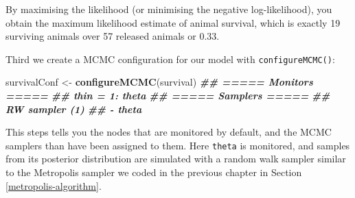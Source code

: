 \documentclass[
  12pt,
]{krantz}
\newenvironment{Shaded}{\begin{snugshade}}{\end{snugshade}}
\newcommand{\AttributeTok}[1]{\textcolor[rgb]{0.13,0.29,0.53}{#1}}
\newcommand{\CommentTok}[1]{\textcolor[rgb]{0.56,0.35,0.01}{\textit{#1}}}
\newcommand{\ControlFlowTok}[1]{\textcolor[rgb]{0.13,0.29,0.53}{\textbf{#1}}}
\newcommand{\DecValTok}[1]{\textcolor[rgb]{0.00,0.00,0.81}{#1}}
\newcommand{\DocumentationTok}[1]{\textcolor[rgb]{0.56,0.35,0.01}{\textbf{\textit{#1}}}}
\newcommand{\FloatTok}[1]{\textcolor[rgb]{0.00,0.00,0.81}{#1}}
\newcommand{\FunctionTok}[1]{\textcolor[rgb]{0.13,0.29,0.53}{\textbf{#1}}}
\newcommand{\NormalTok}[1]{#1}
\newcommand{\OtherTok}[1]{\textcolor[rgb]{0.56,0.35,0.01}{#1}}
\newcommand{\SpecialCharTok}[1]{\textcolor[rgb]{0.81,0.36,0.00}{\textbf{#1}}}
\newcommand{\StringTok}[1]{\textcolor[rgb]{0.31,0.60,0.02}{#1}}
\begin{document}
\begin{Shaded}
\end{Shaded}

By maximising the likelihood (or minimising the negative log-likelihood), you obtain the maximum likelihood estimate of animal survival, which is exactly 19 surviving animals over 57 released animals or 0.33.

Third we create a MCMC configuration for our model with \texttt{configureMCMC()}:

\begin{Shaded}
\begin{Highlighting}[]
\NormalTok{survivalConf }\OtherTok{\textless{}{-}} \FunctionTok{configureMCMC}\NormalTok{(survival)}
\DocumentationTok{\#\# ===== Monitors =====}
\DocumentationTok{\#\# thin = 1: theta}
\DocumentationTok{\#\# ===== Samplers =====}
\DocumentationTok{\#\# RW sampler (1)}
\DocumentationTok{\#\#   {-} theta}
\end{Highlighting}
\end{Shaded}

This steps tells you the nodes that are monitored by default, and the MCMC samplers than have been assigned to them. Here \texttt{theta} is monitored, and samples from its posterior distribution are simulated with a random walk sampler similar to the Metropolis sampler we coded in the previous chapter in Section \ref{metropolis-algorithm}.
\end{document}
